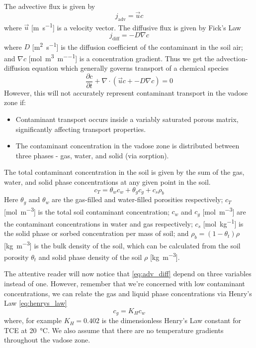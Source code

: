 The advective flux is given by
\begin{equation}
  j_\mathrm{adv} = \vec{u} c
\end{equation}
where $\vec{u}$ [\si{\metre\per\second}] is a velocity vector.
The diffusive flux is given by Fick's Law
\begin{equation}
  j_\mathrm{diff} = -D \nabla c
\end{equation}
where $D$ [\si{\metre\squared\per\second}] is the diffusion coefficient of the contaminant in the soil air;
and $\nabla c$ [\si{\mol\per\metre\cubed\per\metre}] is a concentration gradient.
Thus we get the advection-diffusion equation which generally governs transport of a chemical species
\begin{equation}\label{eq:adv_diff}
  \frac{\partial c}{\partial t} + \nabla \cdot(\vec{u} c + -D \nabla c) = 0
\end{equation}
However, this will not accurately represent contaminant transport in the vadose zone if:
\begin{itemize}
  \item Contaminant transport occurs inside a variably saturated porous matrix, significantly affecting transport properties.
  \item The contaminant concentration in the vadose zone is distributed between three phases - gas, water, and solid (via sorption).
\end{itemize}\par

The total contaminant concentration in the soil is given by the sum of the gas, water, and solid phase concentrations at any given point in the soil.
\begin{equation}
  c_T = \theta_w c_w + \theta_g c_g + c_s \rho_b
\end{equation}
Here $\theta_g$ and $\theta_w$ are the gas-filled and water-filled porosities respectively;
$c_T$ [\si{\mol\per\metre\cubed}] is the total soil contaminant concentration;
$c_w$ and $c_g$ [\si{\mol\per\metre\cubed}] are the contaminant concentrations in water and gas respectively;
$c_s$ [\si{\mol\per\kilogram}] is the solid phase or sorbed concentration per mass of soil;
and $\rho_b = (1-\theta_t) \rho$ [\si{\kilogram\per\metre\cubed}] is the bulk density of the soil, which can be calculated from the soil porosity $\theta_t$ and solid phase density of the soil $\rho$ [\si{\kilogram\per\metre\cubed}].\par

The attentive reader will now notice that \eqref{eq:adv_diff} depend on three variables instead of one.
However, remember that we're concerned with low contaminant concentrations, we can relate the gas and liquid phase concentrations via Henry's Law \eqref{eq:henrys_law}
\begin{equation}\label{eq:henrys_law}
  c_g = K_H c_w
\end{equation}
where, for example $K_H = 0.402$ is the dimensionless Henry's Law constant for TCE at \SI{20}{\degreeCelsius}. %
We also assume that there are no temperature gradients throughout the vadose zone.\par

